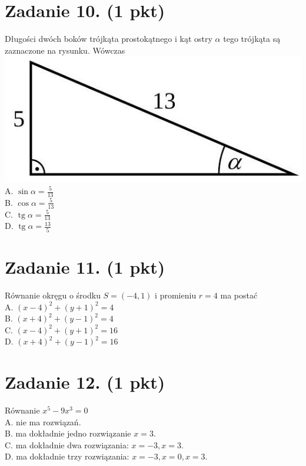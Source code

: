 \documentclass[10pt]{article}
\begin{document}
\section*{Zadanie 10. (1 pkt)}
Długości dwóch boków trójkąta prostokątnego i kąt ostry \(\alpha\) tego trójkąta są zaznaczone na rysunku. Wówczas\\
\includegraphics[max width=\textwidth, center]{2024_11_21_6438f6dbc3784fe6d1deg-04(1)}\\
A. \(\sin \alpha=\frac{5}{13}\)\\
B. \(\cos \alpha=\frac{5}{13}\)\\
C. \(\operatorname{tg} \alpha=\frac{5}{13}\)\\
D. \(\operatorname{tg} \alpha=\frac{13}{5}\)

\section*{Zadanie 11. (1 pkt)}
Równanie okręgu o środku \(S=(-4,1)\) i promieniu \(r=4\) ma postać\\
A. \((x-4)^{2}+(y+1)^{2}=4\)\\
B. \((x+4)^{2}+(y-1)^{2}=4\)\\
C. \((x-4)^{2}+(y+1)^{2}=16\)\\
D. \((x+4)^{2}+(y-1)^{2}=16\)

\section*{Zadanie 12. (1 pkt)}
Równanie \(x^{5}-9 x^{3}=0\)\\
A. nie ma rozwiązań.\\
B. ma dokładnie jedno rozwiązanie \(x=3\).\\
C. ma dokładnie dwa rozwiązania: \(x=-3, x=3\).\\
D. ma dokładnie trzy rozwiązania: \(x=-3, x=0, x=3\).
\end{document}
